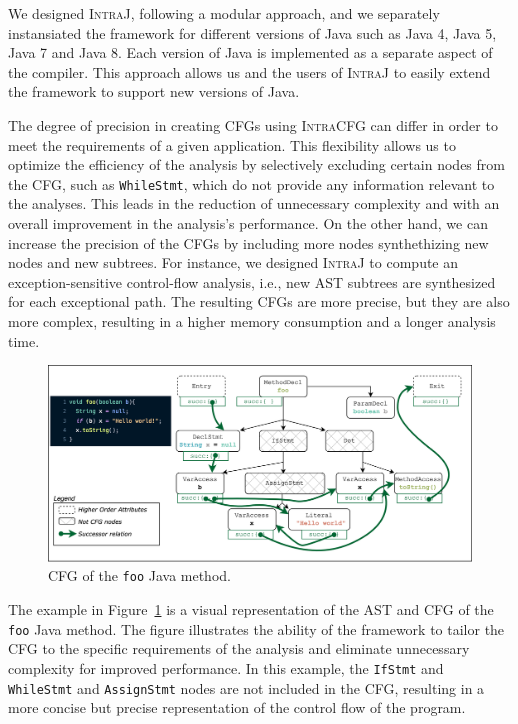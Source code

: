 We designed \textsc{IntraJ}, following a  modular approach, and we separately 
instansiated the framework for different versions of Java such as Java 4, 
Java 5, Java 7 and Java 8. Each version of Java is implemented as a separate
aspect of the compiler. This approach allows us and the users of \textsc{IntraJ}
to easily extend the framework to support new versions of Java.

The degree of precision in creating CFGs using \textsc{IntraCFG} can differ in order
to meet the requirements of a given application.
This flexibility allows us to optimize the efficiency of the analysis by selectively 
excluding certain nodes from the CFG, such as \texttt{WhileStmt}, which do not
provide any information relevant to the analyses. This leads in the reduction of
unnecessary complexity and with an overall improvement in the analysis's performance.
On the other hand, we can increase the precision of the CFGs by including more nodes
synthethizing new nodes and new subtrees. 
For instance, we designed \textsc{IntraJ} to compute an exception-sensitive 
control-flow analysis, i.e., new AST subtrees are synthesized for each exceptional path. 
The resulting CFGs are more precise, but they are also more complex, resulting 
in a higher memory consumption and a longer analysis time.
\begin{figure}[H]
    \centering
    \includegraphics[scale=0.08]{kappa/img/exampleAST.png}
    \caption{\label{fig:CFG} CFG of the \texttt{foo} Java method.}
\end{figure}
The example in Figure~\ref{fig:CFG} is a visual representation of the AST and CFG of the 
\texttt{foo} Java method. The figure illustrates the ability of the framework to tailor the CFG
to the specific requirements of the analysis and eliminate unnecessary complexity for improved performance.
In this example, the \texttt{IfStmt} and \texttt{WhileStmt} and \texttt{AssignStmt} nodes are not included in the CFG,
resulting in a more concise but precise representation of the control flow of the program.


